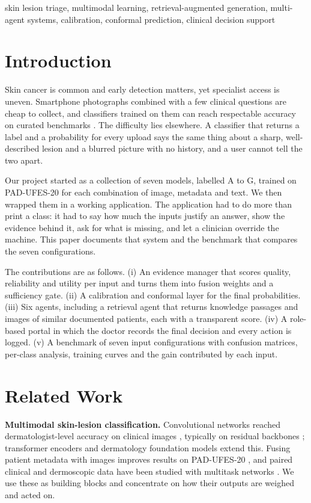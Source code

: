 \documentclass[conference]{IEEEtran}
\begin{document}
\begin{IEEEkeywords}
skin lesion triage, multimodal learning, retrieval-augmented generation, multi-agent systems, calibration, conformal prediction, clinical decision support
\end{IEEEkeywords}

\section{Introduction}
Skin cancer is common and early detection matters, yet specialist access is uneven. Smartphone photographs combined with a few clinical questions are cheap to collect, and classifiers trained on them can reach respectable accuracy on curated benchmarks \cite{esteva2017,pacheco2020}. The difficulty lies elsewhere. A classifier that returns a label and a probability for every upload says the same thing about a sharp, well-described lesion and a blurred picture with no history, and a user cannot tell the two apart.

Our project started as a collection of seven models, labelled A to G, trained on PAD-UFES-20 \cite{pacheco2020} for each combination of image, metadata and text. We then wrapped them in a working application. The application had to do more than print a class: it had to say how much the inputs justify an answer, show the evidence behind it, ask for what is missing, and let a clinician override the machine. This paper documents that system and the benchmark that compares the seven configurations.

The contributions are as follows. (i) An evidence manager that scores quality, reliability and utility per input and turns them into fusion weights and a sufficiency gate. (ii) A calibration and conformal layer for the final probabilities. (iii) Six agents, including a retrieval agent that returns knowledge passages and images of similar documented patients, each with a transparent score. (iv) A role-based portal in which the doctor records the final decision and every action is logged. (v) A benchmark of seven input configurations with confusion matrices, per-class analysis, training curves and the gain contributed by each input.

\section{Related Work}
\textbf{Multimodal skin-lesion classification.} Convolutional networks reached dermatologist-level accuracy on clinical images \cite{esteva2017}, typically on residual backbones \cite{he2016}; transformer encoders \cite{dosovitskiy2021} and dermatology foundation models \cite{yan2025} extend this. Fusing patient metadata with images improves results on PAD-UFES-20 \cite{pacheco2021}, and paired clinical and dermoscopic data have been studied with multitask networks \cite{kawahara2019}. We use these as building blocks and concentrate on how their outputs are weighed and acted on.
\end{document}
